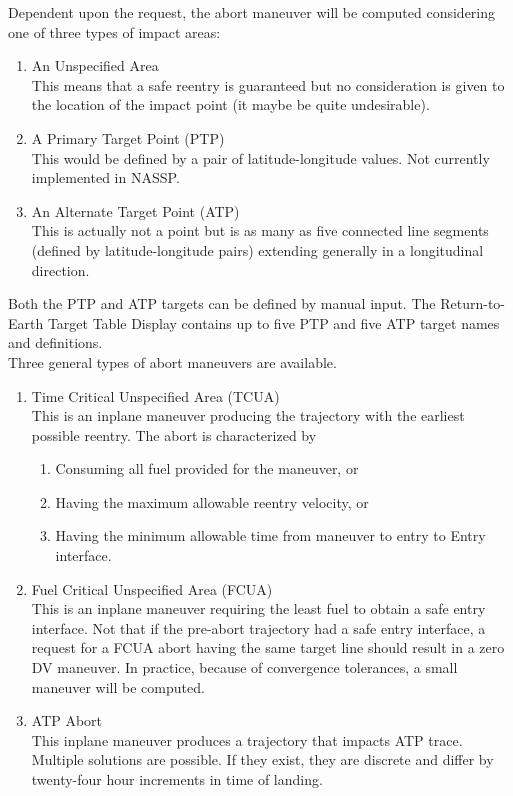 \documentclass[11pt]{article} %
\begin{document}
Dependent upon the request, the abort maneuver will be computed considering one of three types of impact areas:

\begin{enumerate}
	\item An Unspecified Area\\
	This means that a safe reentry is guaranteed but no consideration is given to the location of the impact point (it maybe be quite undesirable).
	\item A Primary Target Point (PTP)\\
	This would be defined by a pair of latitude-longitude values. Not currently implemented in NASSP.
	\item An Alternate Target Point (ATP)\\
	This is actually not a point but is as many as five connected line segments (defined by latitude-longitude pairs) extending generally in a longitudinal direction.\\
\end{enumerate}

Both the PTP and ATP targets can be defined by manual input. The Return-to-Earth Target Table Display contains up to five PTP and five ATP target names and definitions.\\

Three general types of abort maneuvers are available.

\begin{enumerate}
	\item Time Critical Unspecified Area (TCUA)\\
	This is an inplane maneuver producing the trajectory with the earliest possible reentry. The abort is characterized by
	\begin{enumerate}
		\item Consuming all fuel provided for the maneuver, or
		\item Having the maximum allowable reentry velocity, or
		\item Having the minimum allowable time from maneuver to entry to Entry interface.
	\end{enumerate}
	\item Fuel Critical Unspecified Area (FCUA)\\
	This is an inplane maneuver requiring the least fuel to obtain a safe entry interface. Not that if the pre-abort trajectory had a safe entry interface, a request for a FCUA abort having the same target line should result in a zero DV maneuver. In practice, because of convergence tolerances, a small maneuver will be computed.
	\item ATP Abort\\
	This inplane maneuver produces a trajectory that impacts ATP trace. Multiple solutions are possible. If they exist, they are discrete and differ by twenty-four hour increments in time of landing.\\
\end{enumerate}
\end{document}
